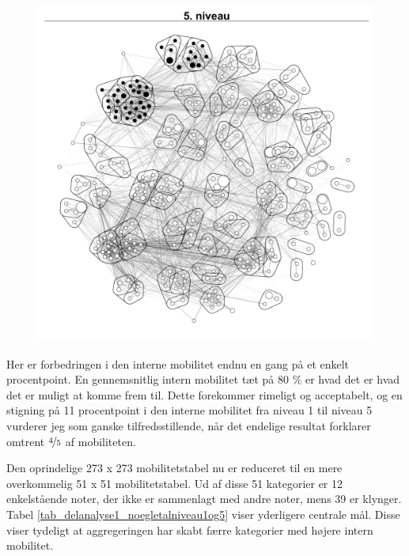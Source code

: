 \begin{figure}[H]
\begin{centering}
  \includegraphics[width=10 cm]{fig/netvaerkskort/kort_seg_proces5.pdf}
  \label{fig_delanalyse1_kort_seg_proces5}
  \caption{}
\end{centering}
\end{figure}

Her er forbedringen i den interne mobilitet endnu en gang på et enkelt procentpoint.  En gennemsnitlig intern mobilitet tæt på 80 \% er hvad det er hvad det er muligt at komme frem til. Dette forekommer rimeligt og acceptabelt, og en stigning på 11 procentpoint i den interne mobilitet fra niveau 1 til niveau 5 vurderer jeg som ganske tilfredsstillende, når det endelige resultat forklarer omtrent $\nicefrac{4}{5}$ af mobiliteten.

Den oprindelige 273 x 273 mobilitetstabel nu er reduceret til en mere overkommelig 51 x 51 mobilitetstabel. Ud af disse 51 kategorier er 12 enkelstående noter, der ikke er sammenlagt med andre noter, mens 39 er klynger. Tabel \ref{tab_delanalyse1_noegletalniveau1og5} viser yderligere centrale mål. Disse viser tydeligt at aggregeringen har skabt færre kategorier med højere intern mobilitet.



